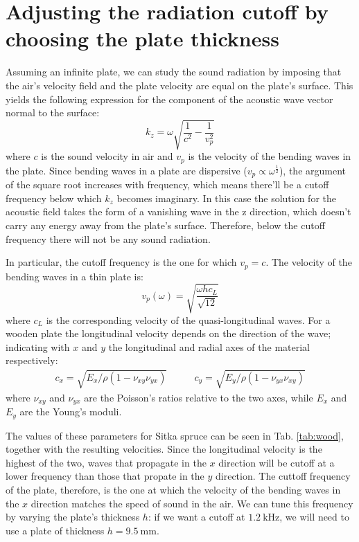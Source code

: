 \documentclass[a4paper]{article}
\begin{document}
\section{Adjusting the radiation cutoff by choosing the plate thickness}

Assuming an infinite plate, we can study the sound radiation by imposing that the air's velocity field and the plate velocity are equal on the plate's surface. This yields the following expression for the component of the acoustic wave vector normal to the surface:
$$ k_z = \omega \sqrt{\frac{1}{c^2} - \frac{1}{v_p^2}} $$
where $c$ is the sound velocity in air and $v_p$ is the velocity of the bending waves in the plate. Since bending waves in a plate are dispersive ($v_p \propto \omega^{\frac{1}{2}}$), the argument of the square root increases with frequency, which means there'll be a cutoff frequency below which $k_z$ becomes imaginary. In this case the solution for the acoustic field takes the form of a vanishing wave in the z direction, which doesn't carry any energy away from the plate's surface. Therefore, below the cutoff frequency there will not be any sound radiation.

In particular, the cutoff frequency is the one for which $v_p = c$. The velocity of the bending waves in a thin plate is:
$$ v_p(\omega) = \sqrt{\frac{\omega hc_L}{\sqrt{12}}} $$
where $c_L$ is the corresponding velocity of the quasi-longitudinal waves. For a wooden plate the longitudinal velocity depends on the direction of the wave; indicating with $x$ and $y$ the longitudinal and radial axes of the material respectively: 
\begin{align*}
	c_x = \sqrt{E_x /\rho(1 - \nu_{xy}\nu_{yx})} \qquad& c_y = \sqrt{E_y /\rho(1 - \nu_{yx}\nu_{xy})}
\end{align*}
where $\nu_{xy}$ and $\nu_{yx}$ are the Poisson's ratios relative to the two axes, while $E_x$ and $E_y$ are the Young's moduli.

The values of these parameters for Sitka spruce can be seen in Tab. \ref{tab:wood}, together with the resulting velocities. Since the longitudinal velocity is the highest of the two, waves that propagate in the $x$ direction will be cutoff at a lower frequency than those that propate in the $y$ direction. The cuttoff frequency of the plate, therefore, is the one at which the velocity of the bending waves in the $x$ direction matches the speed of sound in the air. We can tune this frequency by varying the plate's thickness $h$: if we want a cutoff at $\SI{1.2}{\kilo\hertz}$, we will need to use a plate of thickness $h = \SI{9.5}{\milli\meter}$.
\end{document}
